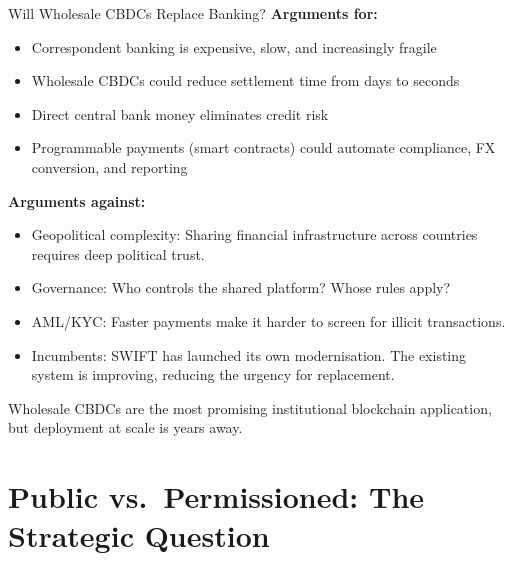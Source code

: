 \documentclass[10pt]{beamer}
\newcommand{\bad}[1]{\textcolor{AccentOrange}{#1}}
\begin{document}
\begin{frame}{Will Wholesale CBDCs Replace Banking?}
  \textbf{Arguments for:}
  \begin{itemize}
    \item Correspondent banking is expensive, slow, and increasingly fragile
    \item Wholesale CBDCs could reduce settlement time from days to seconds
    \item Direct central bank money eliminates credit risk
    \item Programmable payments (smart contracts) could automate compliance, FX conversion, and reporting
  \end{itemize}
  
  \vspace{0.5em}
  \textbf{Arguments against:}
  \begin{itemize}
    \item \bad{Geopolitical complexity}: Sharing financial infrastructure across countries requires deep political trust. 
    \item \bad{Governance}: Who controls the shared platform? Whose rules apply?
    \item \bad{AML/KYC}: Faster payments make it harder to screen for illicit transactions. %
    \item \bad{Incumbents}: SWIFT has launched its own modernisation. The existing system is improving, reducing the urgency for replacement.
  \end{itemize}
  
  \vspace{0.3em}
  Wholesale CBDCs are the most promising institutional blockchain application, but deployment at scale is years away.
\end{frame}

\section{Public vs.\ Permissioned: The Strategic Question}
\end{document}
